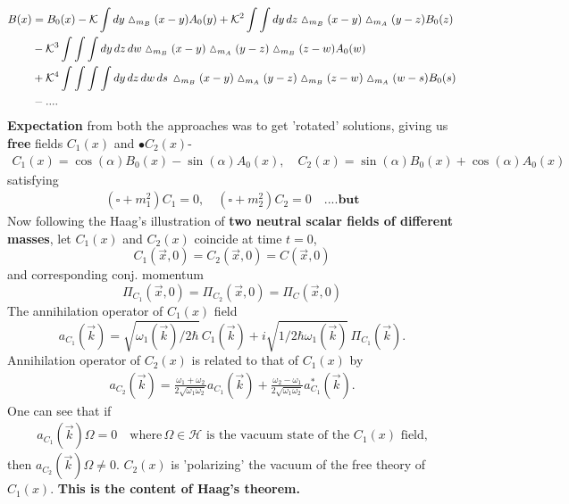 \documentclass[12pt,a4paper]{article}
\numberwithin{equation}{section}
\begin{document}
\begin{align}\label{eq:3.335}
B(x)&=B_0(x)-\mathcal{K}\int dy\vartriangle_{m_B}(x-y)A_0(y)+\mathcal{K}^2\int\int dy \,dz \vartriangle_{m_B}(x-y)\vartriangle_{m_A}(y-z)B_0(z)\notag\\
&-\mathcal{K}^3\int\int\int dy\, dz\, dw \vartriangle_{m_B}(x-y)\vartriangle_{m_A}(y-z)\vartriangle_{m_B}(z-w)A_0(w)\notag\\
&+\mathcal{K}^4\int \int \int \int dy\, dz\, dw\, ds\, \vartriangle_{m_B}(x-y)\vartriangle_{m_A}(y-z)\vartriangle_{m_B}(z-w)\vartriangle_{m_A}(w-s)B_0(s)\notag\\
&-....
\end{align}
\textbf{\textcolor{blue!50!black}{Expectation}} from both the approaches was to get 'rotated' solutions, giving us \textbf{\textcolor{blue!50!black}{free}} fields $C_1(x)$ and $•C_2(x)$-
\begin{align}
C_1(x) = \cos(\alpha) B_0(x) - \sin(\alpha) A_0(x),\quad
C_2(x) = \sin(\alpha) B_0(x) + \cos(\alpha)A_0(x)
\end{align}
satisfying 
\begin{align}\label{eq:3.37}
(\square + m_1^2) C_1 = 0,\quad (\square +m^2_2)C_2 = 0\quad ....\textbf{but}
\end{align}
Now following the Haag's illustration \cite{Haag:212242} of \textbf{\textcolor{blue!50!black}{two neutral scalar fields of different masses}}, let $C_1(x)$ and $C_2(x)$ coincide at time $t=0$, $$C_1(\vec{x},0)=C_2(\vec{x},0)=C(\vec{x},0)$$ and corresponding conj. momentum $$\Pi_{C_1}(\vec{x},0)=\Pi_{C_2}(\vec{x},0)=\Pi_C(\vec{x},0)$$
The annihilation operator of $C_1(x)$ field $$a_{C_1}(\vec{k})=\sqrt{\omega_1(\vec{k})/2\hbar}\,C_1(\vec{k})+i\sqrt{1/2\hbar\omega_1(\vec{k})}\,\Pi_{C_1}(\vec{k}).$$
Annihilation operator of $C_2(x)$ is related to that of $C_1(x)$ by
\begin{align*}
a_{C_2}(\vec{k})=\frac{\omega_1+\omega_2}{2\sqrt{\omega_1\omega_2}}a_{C_1}(\vec{k})+\frac{\omega_2-\omega_1}{2\sqrt{\omega_1\omega_2}}a^*_{C_1}(\vec{k}).
\end{align*}
One can see that if 
\begin{align*}
a_{C_1}(\vec{k})\Omega=0\quad \text{where}\, \Omega\in\mathcal{H}\text{ is the vacuum state of the $C_1(x)$ field,}
\end{align*}
then $a_{C_2}(\vec{k})\Omega\neq0$. $C_2(x)$ is 'polarizing' the vacuum of the free theory of $C_1(x)$.
\textbf{\textcolor{blue!50!black}{This is the content of Haag's theorem.}}\\\\
\end{document}
